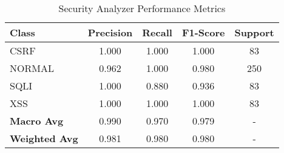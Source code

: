 
\begin{table}[h!]
\centering
\caption{Security Analyzer Performance Metrics}
\label{tab:performance_metrics}
\begin{tabular}{|l|c|c|c|c|}
\hline
\textbf{Class} & \textbf{Precision} & \textbf{Recall} & \textbf{F1-Score} & \textbf{Support} \\
\hline
CSRF & 1.000 & 1.000 & 1.000 & 83 \\
NORMAL & 0.962 & 1.000 & 0.980 & 250 \\
SQLI & 1.000 & 0.880 & 0.936 & 83 \\
XSS & 1.000 & 1.000 & 1.000 & 83 \\
\hline
\textbf{Macro Avg} & 0.990 & 0.970 & 0.979 & - \\
\textbf{Weighted Avg} & 0.981 & 0.980 & 0.980 & - \\
\hline
\end{tabular}
\end{table}
